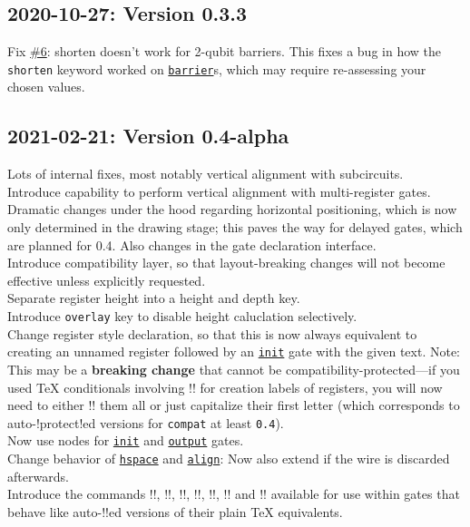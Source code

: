 \documentclass{scrartcl}
\def\gate#1{\hyperref[gate:#1]{\texttt{#1}}}
\begin{document}
      \subsection*{2020-10-27: Version 0.3.3}
         Fix \href{https://github.com/projekter/yquant/issues/6}{\#6}: shorten doesn't work for 2-qubit barriers. This fixes a bug in how the \texttt{shorten} keyword worked on \gate{barrier}s, which may require re\hyp assessing your chosen values.

      \subsection*{2021-02-21: Version 0.4-alpha}
         Lots of internal fixes, most notably vertical alignment with subcircuits. \\
         Introduce capability to perform vertical alignment with multi\hyp register gates. \\
         Dramatic changes under the hood regarding horizontal positioning, which is now only determined in the drawing stage; this paves the way for delayed gates, which are planned for 0.4.
         Also changes in the gate declaration interface. \\
         Introduce compatibility layer, so that layout\hyp breaking changes will not become effective unless explicitly requested. \\
         Separate register height into a height and depth key. \\
         Introduce \texttt{overlay} key to disable height caluclation selectively. \\
         Change register style declaration, so that this is now always equivalent to creating an unnamed register followed by an \gate{init} gate with the given text.
         Note: This may be a \textbf{breaking change} that cannot be compatibility\hyp protected---if you used \TeX{} conditionals involving \tex!\idx! for creation labels of registers, you will now need to either \tex!\protect! them all or just capitalize their first letter (which corresponds to auto\hyp\tex!protect!ed versions for \texttt{compat} at least \texttt{0.4}). \\
         Now use nodes for \gate{init} and \gate{output} gates. \\
         Change behavior of \gate{hspace} and \gate{align}: Now also extend if the wire is discarded afterwards. \\
         Introduce the commands \tex!\Ifnum!, \tex!\Ifcase!, \tex!\Or!, \tex!\Else!, \tex!\Fi!, \tex!\Unless! and \tex!\The! available for use within gates that behave like auto\hyp\tex!\protect!ed versions of their plain \TeX{} equivalents.
\end{document}
